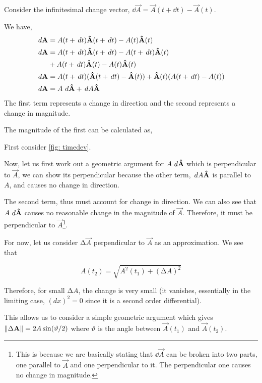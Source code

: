 \begin{example}
    Consider the infinitesimal change vector, \(\dd{\vec{A}} = \vec{A}(t + \dd{t}) - \vec{A}(t)\).
    
    We have, 
    \begin{align*}
        \mathop{}{d}{\boldsymbol{\mathbf{A}}} &= A(t + \mathop{}{d}{t})\boldsymbol{\mathbf{\hat{A}}}(t + \mathop{}{d}{t}) - A(t)\boldsymbol{\mathbf{\hat{A}}}(t) \\
        \mathop{}{d}{\boldsymbol{\mathbf{A}}} &= A(t + \mathop{}{d}{t})\boldsymbol{\mathbf{\hat{A}}}(t + \mathop{}{d}{t}) - A(t + \mathop{}{d}{t})\boldsymbol{\mathbf{\hat{A}}}(t) \\ 
        & + A(t + \mathop{}{d}{t})\boldsymbol{\mathbf{\hat{A}}}(t) - A(t)\boldsymbol{\mathbf{\hat{A}}}(t) \\
        \mathop{}{d}{\boldsymbol{\mathbf{A}}} &= A(t + \mathop{}{d}{t})(\boldsymbol{\mathbf{\hat{A}}}(t + \mathop{}{d}{t}) - \boldsymbol{\mathbf{\hat{A}}}(t)) + \boldsymbol{\mathbf{\hat{A}}}(t)(A(t + \mathop{}{d}{t}) - A(t)) \\
        \mathop{}{d}{\boldsymbol{\mathbf{A}}} &= A\mathop{}{d}{\boldsymbol{\mathbf{\hat{A}}}} + \mathop{}{d}{A}\boldsymbol{\mathbf{\hat{A}}} 
    \end{align*}
The first term represents a change in direction and the second represents a change in 
magnitude.
\end{example}

The magnitude of the first can be calculated as,

First consider \cref{fig: timedev}.

Now, let us first work out a geometric argument for \(A\mathop{}{d}{\boldsymbol{\mathbf{\hat{A}}}}\)
which is perpendicular to \(\vec{A}\), we can show its perpendicular because 
the other term, \(\mathop{}{d}{A} \boldsymbol{\mathbf{\hat{A}}}\) is parallel to \(A\), and causes no change in direction. 

The second term, thus must account for change in direction. We can also see that \(A\mathop{}{d}{\boldsymbol{\mathbf{\hat{A}}}}\)
causes no reasonable change in the magnitude of \(\vec{A}\). Therefore, it must be perpendicular to \(\vec{A}\)\footnote{This is because we are basically stating that \(\dd{\vec{A}}\) can be broken into two parts,
one parallel to \(\vec{A}\) and one perpendicular to it. The perpendicular one causes 
no change in magnitude.}.

For now, let us consider \(\increment \vec{A}\) perpendicular to \(\vec{A}\) as an approximation. We see that 

\begin{equation*}
    A(t_2) = \sqrt{A^2(t_1) + (\increment A)^2}
\end{equation*}

Therefore, for small \(\increment A\), the change is very small (it vanishes, essentially 
in the limiting case, \((dx)^2 = 0\) since it is a second order differential).

This allows us to consider a simple geometric argument which gives \(\norm{\Delta \boldsymbol{\mathbf{A}}} = 2A\sin(\vartheta/2)\)
where \(\vartheta\) is the angle between \(\vec{A}(t_1)\) and \(\vec{A}(t_2)\).

